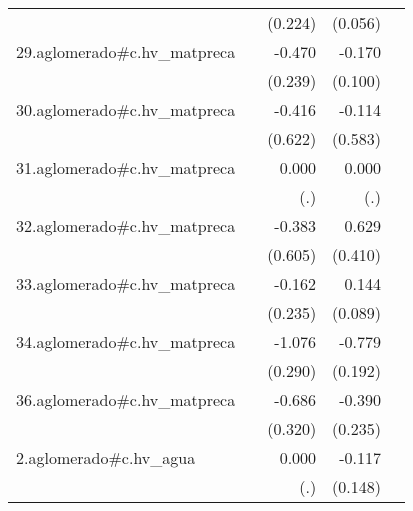 {\begin{longtable}{l*{4}{D{.}{.}{-1}}}
            &                     &     (0.224)         &     (0.056)         &                     \\
\addlinespace
29.aglomerado#c.hv\_matpreca&                     &      -0.470\sym{*}  &      -0.170         &                     \\
            &                     &     (0.239)         &     (0.100)         &                     \\
\addlinespace
30.aglomerado#c.hv\_matpreca&                     &      -0.416         &      -0.114         &                     \\
            &                     &     (0.622)         &     (0.583)         &                     \\
\addlinespace
31.aglomerado#c.hv\_matpreca&                     &       0.000         &       0.000         &                     \\
            &                     &         (.)         &         (.)         &                     \\
\addlinespace
32.aglomerado#c.hv\_matpreca&                     &      -0.383         &       0.629         &                     \\
            &                     &     (0.605)         &     (0.410)         &                     \\
\addlinespace
33.aglomerado#c.hv\_matpreca&                     &      -0.162         &       0.144         &                     \\
            &                     &     (0.235)         &     (0.089)         &                     \\
\addlinespace
34.aglomerado#c.hv\_matpreca&                     &      -1.076\sym{***}&      -0.779\sym{***}&                     \\
            &                     &     (0.290)         &     (0.192)         &                     \\
\addlinespace
36.aglomerado#c.hv\_matpreca&                     &      -0.686\sym{*}  &      -0.390         &                     \\
            &                     &     (0.320)         &     (0.235)         &                     \\
\addlinespace
2.aglomerado#c.hv\_agua&                     &       0.000         &      -0.117         &                     \\
            &                     &         (.)         &     (0.148)         &                     \\

\end{longtable}}
